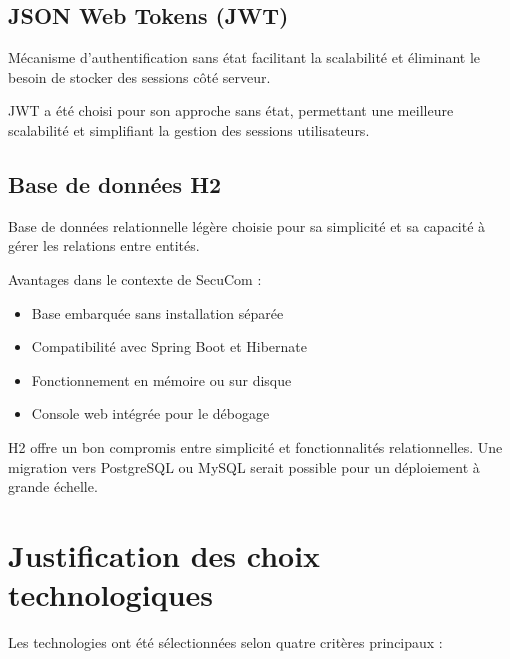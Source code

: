 \subsection{JSON Web Tokens (JWT)}
\noindent Mécanisme d'authentification sans état facilitant la scalabilité et éliminant le besoin de stocker des sessions côté serveur.

\begin{note}
JWT a été choisi pour son approche sans état, permettant une meilleure scalabilité et simplifiant la gestion des sessions utilisateurs.
\end{note}

\subsection{Base de données H2}
\noindent Base de données relationnelle légère choisie pour sa simplicité et sa capacité à gérer les relations entre entités.

\noindent Avantages dans le contexte de SecuCom :
\begin{itemize}[leftmargin=*,label=\textcolor{darkgray}{$\bullet$},itemsep=0.3em]
  \item Base embarquée sans installation séparée
  \item Compatibilité avec Spring Boot et Hibernate
  \item Fonctionnement en mémoire ou sur disque
  \item Console web intégrée pour le débogage
\end{itemize}

\begin{note}
H2 offre un bon compromis entre simplicité et fonctionnalités relationnelles. Une migration vers PostgreSQL ou MySQL serait possible pour un déploiement à grande échelle.
\end{note}

\section{Justification des choix technologiques}

\noindent Les technologies ont été sélectionnées selon quatre critères principaux :

\vspace{0.5cm}

